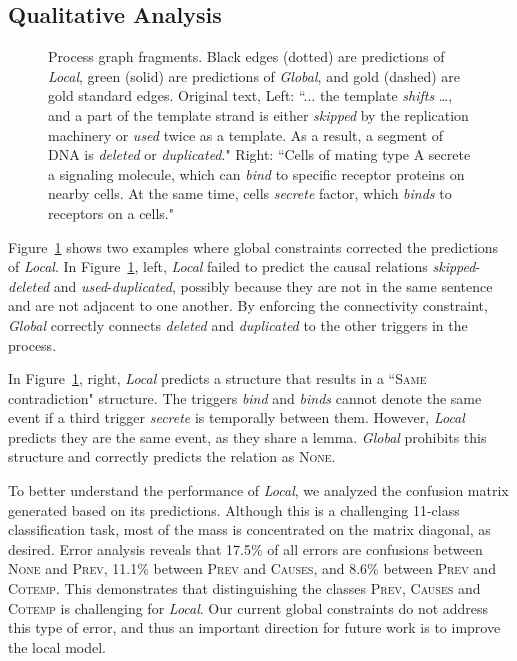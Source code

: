 \subsection{Qualitative Analysis} \label{subsec:analysis}
\begin{figure}[t]
\centering
{}
\caption{Process graph fragments. Black edges (dotted) are predictions of \emph{Local}, green (solid) are predictions of \emph{Global}, and gold (dashed) are gold standard edges. Original text, Left: ``... the template \emph{shifts} \ldots, and a part of the template strand is either \emph{skipped} by the replication machinery or \emph{used} twice as a template.
As a result, a segment of DNA is \emph{deleted} or \emph{duplicated}." Right: ``Cells of mating type A secrete a signaling molecule, which can \emph{bind} to specific receptor proteins on nearby cells. At the same time, cells \emph{secrete} factor, which \emph{binds} to receptors on a cells."}
\label{fig:graph}
\end{figure}

Figure~\ref{fig:graph} shows two examples where global constraints corrected the predictions of \emph{Local}. In Figure~\ref{fig:graph}, left, \emph{Local} failed to predict the causal relations \emph{skipped}-\emph{deleted} and \emph{used}-\emph{duplicated}, possibly because they are not in the same sentence and are not adjacent to one another. By enforcing the connectivity constraint, \emph{Global} correctly connects \emph{deleted} and \emph{duplicated} to the other triggers in the process.

In Figure~\ref{fig:graph}, right, \emph{Local} predicts a structure that results in a ``\textsc{Same} contradiction" structure. The triggers \emph{bind} and \emph{binds} cannot denote the same event if a third trigger \emph{secrete} is temporally between them. However, \emph{Local} predicts they are the same event, as they share a lemma. \emph{Global} prohibits this structure and correctly predicts the relation as \textsc{None}.

To better understand the performance of \emph{Local}, we analyzed the confusion matrix generated based on its predictions. Although this is a challenging 11-class classification task, most of the mass is concentrated on the matrix diagonal, as desired. Error analysis reveals that 17.5\% of all errors are confusions between \textsc{None} and \textsc{Prev}, 11.1\% between \textsc{Prev} and \textsc{Causes}, and 8.6\% between \textsc{Prev} and \textsc{Cotemp}. This demonstrates that distinguishing the classes \textsc{Prev}, \textsc{Causes} and \textsc{Cotemp} is challenging for \emph{Local}. Our current global constraints do not address this type of error, and thus an important direction for future work is to improve the local model. 

